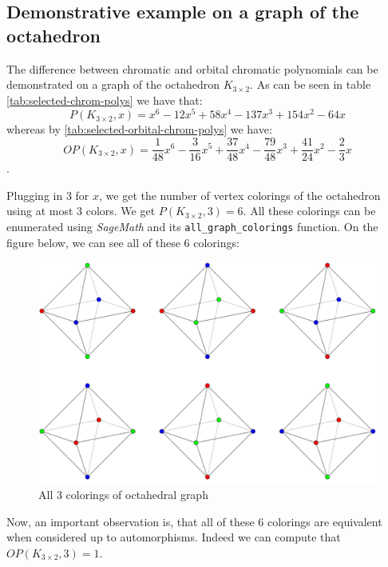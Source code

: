 \subsection{Demonstrative example on a graph of the octahedron}

The difference between chromatic and orbital chromatic polynomials can be demonstrated on a graph of the octahedron $K_{3 \times 2}$. As can be seen in table \ref{tab:selected-chrom-polys} we have that: $$P(K_{3 \times 2},x) = x^{6} - 12x^{5} + 58x^{4} - 137x^{3} + 154x^{2} - 64x$$ whereas by \ref{tab:selected-orbital-chrom-polys} 
 we have: $$OP(K_{3 \times 2},x) = \frac{1}{48}x^{6} - \frac{3}{16}x^{5} + \frac{37}{48}x^{4} - \frac{79}{48}x^{3} + \frac{41}{24}x^{2} - \frac{2}{3}x$$.

Plugging in $3$ for $x$, we get the number of vertex colorings of the octahedron using at most $3$ colors. We get $P(K_{3 \times 2},3) = 6$. All these colorings can be enumerated using \textit{SageMath} \cite{sagemath} and its \verb|all_graph_colorings| function. On the figure below, we can see all of these $6$ colorings:

\begin{figure}[H]
    \centering
    \includegraphics[width=1\textwidth]{../Resources/Figs/octahedron_3-clrings.pdf}
    \caption{All 3 colorings of octahedral graph}
    \label{fig:octahedron-3-clrings}
\end{figure}

Now, an important observation is, that all of these $6$ colorings are equivalent when considered up to automorphisms. Indeed we can compute that $OP(K_{3 \times 2},3) = 1$.

